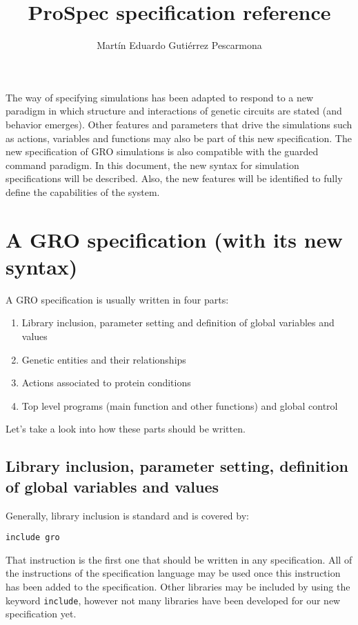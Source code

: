 \documentclass[10pt,a4paper]{article}
\begin{document}
\title{ProSpec specification reference}
\author{Mart\'{i}n Eduardo Guti\'{e}rrez Pescarmona}
\maketitle

The way of specifying simulations has been adapted to respond to a new paradigm in which structure and interactions of genetic circuits are stated (and behavior emerges). Other features and parameters that drive the simulations such as actions, variables and functions may also be part of this new specification. The new specification of GRO simulations is also compatible with the guarded command paradigm.
In this document, the new syntax for simulation specifications will be described. Also, the new features will be identified to fully define the capabilities of the system. \newline


\section{A GRO specification (with its new syntax)}
A GRO specification is usually written in four parts:
\begin{enumerate}
	\item Library inclusion, parameter setting and definition of global variables and values
	\item Genetic entities and their relationships
	\item Actions associated to protein conditions
	\item Top level programs (main function and other functions) and global control
\end{enumerate}

Let’s take a look into how these parts should be written. \newline

\subsection{Library inclusion, parameter setting, definition of global variables and values}
Generally, library inclusion is standard and is covered by:
\newline

\texttt{include gro}
\newline

That instruction is the first one that should be written in any specification. All of the instructions of the specification language may be used once this instruction has been added to the specification. Other libraries may be included by using the keyword \texttt{include}, however not many libraries have been developed for our new specification yet. \newline
\end{document}
